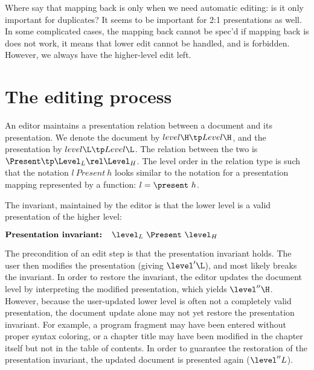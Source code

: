 

\bc
Where say that mapping back is only when we need automatic editing: is it only important for duplicates? It seems to be important for 2:1 presentations as well.  In some complicated cases, the mapping back cannot be spec'd if mapping back is does not work, it means that lower edit cannot be handled, and is forbidden. However, we always have the higher-level edit left.
\ec



%																
%																
%																
\section{The editing process}\label{sect:editProces}



An editor maintains a presentation relation between a document and its presentation. We denote the document by 
$level\H \tp Level\H$, and the presentation by $level\L \tp Level\L$. The relation between the two is
$\Present \tp \Level_{L} \rel \Level_{H}$.  The level order in the relation type is such that the notation $l~Present~h$ looks similar to the notation for a presentation mapping represented by a function: $l = \present~h$. 


The invariant, maintained by the editor is that the lower level is a valid presentation of the higher level:

\begin{math}
\text{\bf Presentation invariant:~~~} \level_{L}~\Present~\level_{H}\\
\end{math}


The precondition of an edit step is that the presentation invariant holds. The user then modifies the presentation (giving $\level'\L$), and most likely breaks the invariant. In order to restore the invariant, the editor updates the document level by interpreting the modified presentation, which yields $\level''\H$. However, because the user-updated lower level is often not a completely valid presentation, the document update alone may not yet restore the presentation invariant. For example, a program fragment may have been entered without proper syntax coloring, or a chapter title may have been modified in the chapter itself but not in the table of contents. In order to guarantee the restoration of the presentation invariant, the updated document is presented again ($\level''L$).

